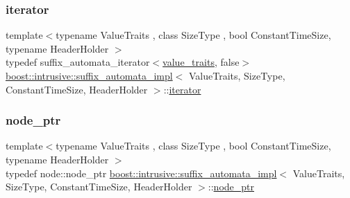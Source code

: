 \mbox{\label{classboost_1_1intrusive_1_1suffix__automata__impl_af7c03e2d35758eb2040a589cc35cc36c}} 
\subsubsection{\texorpdfstring{iterator}{iterator}}
{\footnotesize\ttfamily template$<$typename Value\+Traits , class Size\+Type , bool Constant\+Time\+Size, typename Header\+Holder $>$ \\
typedef suffix\+\_\+automata\+\_\+iterator$<$\hyperlink{classboost_1_1intrusive_1_1suffix__automata__impl_abbf3dee8caf18613db903931801c6076}{value\+\_\+traits}, false$>$ \hyperlink{classboost_1_1intrusive_1_1suffix__automata__impl}{boost\+::intrusive\+::suffix\+\_\+automata\+\_\+impl}$<$ Value\+Traits, Size\+Type, Constant\+Time\+Size, Header\+Holder $>$\+::\hyperlink{classboost_1_1intrusive_1_1suffix__automata__impl_af7c03e2d35758eb2040a589cc35cc36c}{iterator}}

\mbox{\label{classboost_1_1intrusive_1_1suffix__automata__impl_ab2d4128c7fc9c5ba87fa9eb5d50c318a}} 
\subsubsection{\texorpdfstring{node\+\_\+ptr}{node\_ptr}}
{\footnotesize\ttfamily template$<$typename Value\+Traits , class Size\+Type , bool Constant\+Time\+Size, typename Header\+Holder $>$ \\
typedef node\+::node\+\_\+ptr \hyperlink{classboost_1_1intrusive_1_1suffix__automata__impl}{boost\+::intrusive\+::suffix\+\_\+automata\+\_\+impl}$<$ Value\+Traits, Size\+Type, Constant\+Time\+Size, Header\+Holder $>$\+::\hyperlink{classboost_1_1intrusive_1_1suffix__automata__impl_ab2d4128c7fc9c5ba87fa9eb5d50c318a}{node\+\_\+ptr}}

